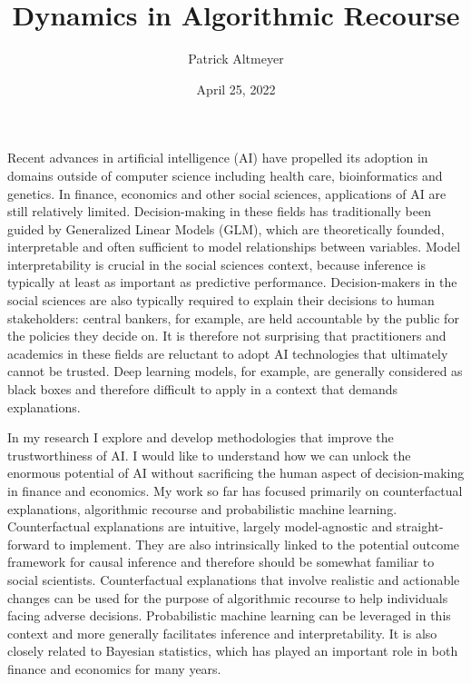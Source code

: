 \documentclass[
]{acmconf}
\title{Dynamics in Algorithmic Recourse}
\author{Patrick Altmeyer}
\date{April 25, 2022}
\begin{document}
\maketitle

\ifdefined\Shaded\renewenvironment{Shaded}{\begin{tcolorbox}[interior hidden, borderline west={3pt}{0pt}{shadecolor}, sharp corners, frame hidden, boxrule=0pt, enhanced, breakable]}{\end{tcolorbox}}\fi

Recent advances in artificial intelligence (AI) have propelled its
adoption in domains outside of computer science including health care,
bioinformatics and genetics. In finance, economics and other social
sciences, applications of AI are still relatively limited.
Decision-making in these fields has traditionally been guided by
Generalized Linear Models (GLM), which are theoretically founded,
interpretable and often sufficient to model relationships between
variables. Model interpretability is crucial in the social sciences
context, because inference is typically at least as important as
predictive performance. Decision-makers in the social sciences are also
typically required to explain their decisions to human stakeholders:
central bankers, for example, are held accountable by the public for the
policies they decide on. It is therefore not surprising that
practitioners and academics in these fields are reluctant to adopt AI
technologies that ultimately cannot be trusted. Deep learning models,
for example, are generally considered as black boxes and therefore
difficult to apply in a context that demands explanations.

In my research I explore and develop methodologies that improve the
trustworthiness of AI. I would like to understand how we can unlock the
enormous potential of AI without sacrificing the human aspect of
decision-making in finance and economics. My work so far has focused
primarily on counterfactual explanations, algorithmic recourse and
probabilistic machine learning. Counterfactual explanations are
intuitive, largely model-agnostic and straight-forward to implement.
They are also intrinsically linked to the potential outcome framework
for causal inference and therefore should be somewhat familiar to social
scientists. Counterfactual explanations that involve realistic and
actionable changes can be used for the purpose of algorithmic recourse
to help individuals facing adverse decisions. Probabilistic machine
learning can be leveraged in this context and more generally facilitates
inference and interpretability. It is also closely related to Bayesian
statistics, which has played an important role in both finance and
economics for many years.
\end{document}
